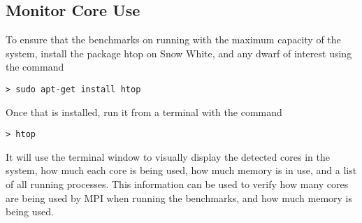 \subsection{Monitor Core Use}

To ensure that the benchmarks on running with the maximum capacity of the system, install the package htop on Snow White, and any dwarf of interest using the command
\begin{lstlisting}
> sudo apt-get install htop
\end{lstlisting}
Once that is installed, run it from a terminal with the command
\begin{lstlisting}
> htop
\end{lstlisting}
It will use the terminal window to visually display the detected cores in the system, how much each core is being used, how much memory is in use, and a list of all running processes. This information can be used to verify how many cores are being used by MPI when running the benchmarks, and how much memory is being used. 
